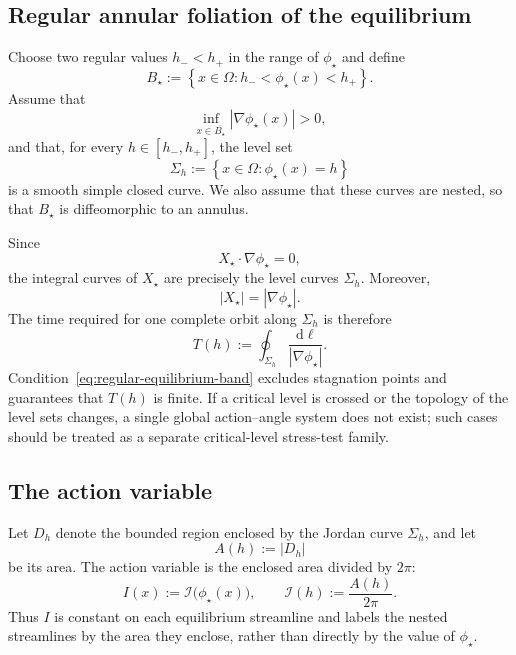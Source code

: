 \documentclass[11pt,a4paper]{article}
\newcommand{\Om}{\Omega}
\newcommand{\dd}{\,\mathrm{d}}
\newcommand{\abs}[1]{\left|#1\right|}
\begin{document}
\subsection{Regular annular foliation of the equilibrium}

Choose two regular values $h_-<h_+$ in the range of $\phi_\star$ and define
\begin{equation}
  B_\star
  :=\left\{x\in\Om:h_-<\phi_\star(x)<h_+\right\}.
  \label{eq:equilibrium-band}
\end{equation}
Assume that
\begin{equation}
  \inf_{x\in\overline{B_\star}}\abs{\nabla\phi_\star(x)}>0,
  \label{eq:regular-equilibrium-band}
\end{equation}
and that, for every $h\in[h_-,h_+]$, the level set
\begin{equation}
  \Sigma_h:=\left\{x\in\Om:\phi_\star(x)=h\right\}
  \label{eq:equilibrium-level-set}
\end{equation}
is a smooth simple closed curve. We also assume that these curves are nested, so that $B_\star$ is diffeomorphic to an annulus.

Since
\begin{equation}
  X_\star\cdot\nabla\phi_\star=0,
\end{equation}
the integral curves of $X_\star$ are precisely the level curves $\Sigma_h$. Moreover,
\begin{equation}
  \abs{X_\star}=\abs{\nabla\phi_\star}.
\end{equation}
The time required for one complete orbit along $\Sigma_h$ is therefore
\begin{equation}
  T(h)
  :=\oint_{\Sigma_h}\frac{\dd\ell}{\abs{\nabla\phi_\star}}.
  \label{eq:period}
\end{equation}
Condition~\eqref{eq:regular-equilibrium-band} excludes stagnation points and guarantees that $T(h)$ is finite. If a critical level is crossed or the topology of the level sets changes, a single global action--angle system does not exist; such cases should be treated as a separate critical-level stress-test family.

\subsection{The action variable}

Let $D_h$ denote the bounded region enclosed by the Jordan curve $\Sigma_h$, and let
\begin{equation}
  A(h):=\abs{D_h}
\end{equation}
be its area. The action variable is the enclosed area divided by $2\pi$:
\begin{equation}
  I(x)
  :=\mathcal{I}\bigl(\phi_\star(x)\bigr),
  \qquad
  \mathcal{I}(h):=\frac{A(h)}{2\pi}.
  \label{eq:action-def}
\end{equation}
Thus $I$ is constant on each equilibrium streamline and labels the nested streamlines by the area they enclose, rather than directly by the value of $\phi_\star$.
\end{document}
